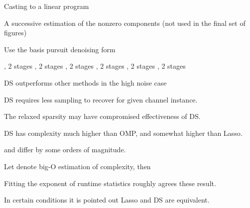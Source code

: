 {
\I Casting to a linear program

\I A successive estimation of the nonzero components (not used in the final set of figures)

\I Use the basis pursuit denoising form
}
{
\I {}, 2 stages
\blank [big]
}
{
\I {}, 2 stages
\blank [big]
}
{
\I {}, 2 stages
\blank [big]
}
{
\I {}, 2 stages
\blank [big]
}
{
\I {}, 2 stages
\blank [big]
}
{
\I {}, 2 stages
\blank [big]
}
{
\I DS outperforms other methods in the high noise case

\I DS requires less sampling to recover for given channel instance.

\I The relaxed sparsity may have compromised effectiveness of DS.

\I DS has complexity much higher than OMP, and somewhat higher than Lasso.

\I \m {\T {\chi}} and \m {\chi} differ by some orders of magnitude.
}
{
\I Let  denote big-O estimation of complexity, then

\I Fitting the exponent of runtime statistics roughly agrees these result.

\I In certain conditions it is pointed out Lasso and DS are equivalent.
}


